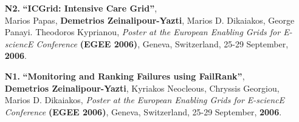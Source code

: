 \documentclass[10pt]{article}
\begin{document}
\begin{enumerate}
\item [{\bf N2.}]
\label{N2}
{\bf ``ICGrid: Intensive Care Grid''}, \\
Marios Papas, {\bf Demetrios Zeinalipour-Yazti}, Marios D. Dikaiakos, George Panayi. Theodoros Kyprianou,
{\em  Poster at the European Enabling Grids for E-sciencE Conference} {\bf (EGEE 2006)}, 
Geneva, Switzerland, 25-29 September, {\bf 2006}.

\item [{\bf N1.}]
\label{N1}
\label{failrank-egee06}
{\bf ``Monitoring and Ranking Failures using FailRank''}, \\
{\bf Demetrios Zeinalipour-Yazti}, Kyriakos Neocleous, Chryssis Georgiou, Marios D. Dikaiakos, 
{\em  Poster at the European Enabling Grids for E-sciencE Conference} {\bf (EGEE 2006)}, 
Geneva, Switzerland, 25-29 September, {\bf 2006}.   

\end{enumerate}
\end{document}
